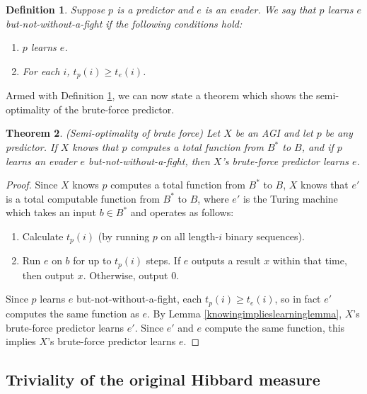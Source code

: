 \documentclass{article}
\newtheorem{theorem}{Theorem}
\newtheorem{definition}[theorem]{Definition}
\begin{document}
\begin{definition}
\label{notwithoutafightdefn}
    Suppose $p$ is a predictor and $e$ is an evader.
    We say that \emph{$p$ learns $e$ but-not-without-a-fight}
    if the following conditions hold:
    \begin{enumerate}
        \item $p$ learns $e$.
        \item For each $i$, $t_p(i)\geq t_e(i)$.
    \end{enumerate}
\end{definition}

Armed with Definition \ref{notwithoutafightdefn}, we can now state a theorem
which shows the semi-optimality of the brute-force predictor.

\begin{theorem}
\label{semioptimalitytheorem}
    (Semi-optimality of brute force)
    Let $X$ be an AGI and let $p$ be any predictor.
    If $X$ knows that $p$ computes a total function from $B^*$ to $B$,
    and if $p$ learns an evader $e$ but-not-without-a-fight,
    then $X$'s brute-force predictor learns $e$.
\end{theorem}

\begin{proof}
    Since $X$ knows $p$ computes a total
    function from $B^*$ to $B$, $X$ knows that $e'$ is a total
    computable function from $B^*$ to $B$, where $e'$ is the Turing machine which
    takes an input $b\in B^*$ and operates as follows:
    \begin{enumerate}
        \item
        Calculate $t_p(i)$ (by running $p$ on all length-$i$ binary sequences).
        \item
        Run $e$ on $b$ for up to $t_p(i)$ steps. If $e$ outputs a result $x$ within that
        time, then output $x$. Otherwise, output $0$.
    \end{enumerate}
    Since $p$ learns $e$ but-not-without-a-fight, each $t_p(i)\geq t_e(i)$,
    so in fact $e'$ computes the same function as $e$.
    By Lemma \ref{knowingimplieslearninglemma}, $X$'s brute-force predictor
    learns $e'$. Since $e'$ and $e$ compute the same function, this implies
    $X$'s brute-force predictor learns $e$.
\end{proof}

\subsection{Triviality of the original Hibbard measure}
\label{trivialitysubsection}
\end{document}
